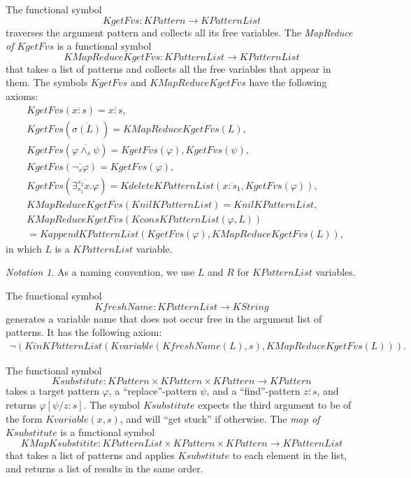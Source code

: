 \documentclass[UTF8,11pt]{article}
\newcounter{thmcounter}
\theoremstyle{plain}
\theoremstyle{definition}
\theoremstyle{remark}
\newtheorem{notation}   [thmcounter]{Notation}
\newcommand{\cln}{{:}}
\newcommand{\KString}{\mathit{KString}}
\newcommand{\KPatternList}{\mathit{KPatternList}}
\newcommand{\KnilKPatternList}{\mathit{KnilKPatternList}}
\newcommand{\KconsKPatternList}{\mathit{KconsKPatternList}}
\newcommand{\KappendKPatternList}{\mathit{KappendKPatternList}}
\newcommand{\KinKPatternList}{\mathit{KinKPatternList}}
\newcommand{\KdeleteKPatternList}{\mathit{KdeleteKPatternList}}
\newcommand{\KPattern}{\mathit{KPattern}}
\newcommand{\Kvariable}{\mathit{Kvariable}}
\newcommand{\KgetFvs}{\mathit{KgetFvs}}
\newcommand{\KMapReduceKgetFvs}{\mathit{KMapReduceKgetFvs}}
\newcommand{\KfreshName}{\mathit{KfreshName}}
\newcommand{\Ksubstitute}{\mathit{Ksubstitute}}
\newcommand{\KMapKsubstitite}{\mathit{KMapKsubstitite}}
\begin{document}
The functional symbol 
$$\KgetFvs \colon \KPattern \to \KPatternList$$
traverses the argument pattern and collects all its free variables.
The \emph{MapReduce of $\KgetFvs$} is a functional symbol
$$ \KMapReduceKgetFvs \colon \KPatternList \to \KPatternList $$
that takes a list of patterns and collects all the free variables that appear in them.
The symbols $\KgetFvs$ and $\KMapReduceKgetFvs$ have the following axioms:
\begin{align*}
  & \KgetFvs(\overline{x \cln s}) = \overline{x \cln s},
  \\
  & \KgetFvs(\overline{\sigma(L)}) = \KMapReduceKgetFvs(L),
  \\
  & \KgetFvs(\overline{\varphi \wedge_s \psi}) = \KgetFvs(\varphi), \KgetFvs(\psi),
  \\
  & \KgetFvs(\overline{\neg_s \varphi}) = \KgetFvs(\varphi),
  \\
  & \KgetFvs(\overline{\exists_{s_1}^{s_2} x . \varphi}) = \KdeleteKPatternList(\overline{x \cln s_1}, \KgetFvs(\varphi)),
  \\
  & \KMapReduceKgetFvs(\KnilKPatternList) = \KnilKPatternList,
  \\
  & \KMapReduceKgetFvs(\KconsKPatternList(\varphi, L))
  \\
  & = \KappendKPatternList(\KgetFvs(\varphi), \KMapReduceKgetFvs(L)),
\end{align*}
in which $L$ is a $\KPatternList$ variable.

\begin{notation}
	As a naming convention, we use $L$ and $R$ for $\KPatternList$ variables. 
\end{notation}

The functional symbol
$$\KfreshName \colon \KPatternList \to \KString$$ 
generates a variable name that does not occur free in the argument list of patterns.
It has the following axiom:
\begin{align*}
\neg(\KinKPatternList(\Kvariable(\KfreshName(L), s), \KMapReduceKgetFvs(L))).
\end{align*}

The functional symbol
$$\Ksubstitute \colon \KPattern \times \KPattern \times \KPattern \to \KPattern$$
takes a target pattern $\varphi$, a ``replace''-pattern $\psi$, and a ``find''-pattern $\overline{z \cln s}$, and returns $\varphi[\psi / z \cln s]$.
The symbol $\Ksubstitute$ expects the third argument to be of the form $\Kvariable(x, s)$, and will ``get stuck'' if otherwise.
The \emph{map of} $\Ksubstitute$ is a functional symbol
$$ \KMapKsubstitite \colon \KPatternList \times \KPattern \times \KPattern \to \KPatternList $$
that takes a list of patterns and applies $\Ksubstitute$ to each element in the list, and returns a list of results in the same order.
\end{document}
